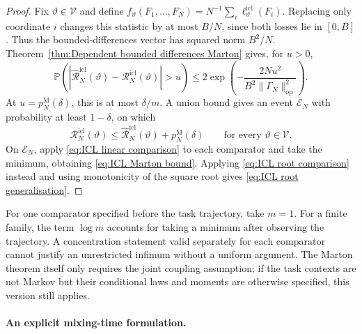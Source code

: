 \begin{proof}
Fix \(\vartheta\in\mathcal V\) and define \(f_\vartheta(F_1,\ldots,F_N)=N^{-1}\sum_i\ell_\vartheta^{\mathrm{icl}}(F_i)\). Replacing only coordinate \(i\) changes this statistic by at most \(B/N\), since both losses lie in \([0,B]\). Thus the bounded-differences vector has squared norm \(B^2/N\). Theorem~\ref{thm:Dependent bounded differences Marton} gives, for \(u>0\),
\[
\mathbb P\left(
\left|\widehat{\mathcal R}_N^{\mathrm{icl}}(\vartheta)
-\mathcal R_N^{\mathrm{icl}}(\vartheta)\right|>u\right)
\leqslant2\exp\left(-\frac{2Nu^2}{B^2\|\Gamma_N\|_{\mathrm{op}}^2}\right).
\]
At \(u=p_N^{\mathrm M}(\delta)\), this is at most \(\delta/m\). A union bound gives an event \(\mathcal E_N\) with probability at least \(1-\delta\), on which
\begin{equation}
\label{eq:ICL simultaneous comparator event}
\mathcal R_N^{\mathrm{icl}}(\vartheta)
\leqslant\widehat{\mathcal R}_N^{\mathrm{icl}}(\vartheta)+p_N^{\mathrm M}(\delta)
\qquad\text{for every }\vartheta\in\mathcal V.
\end{equation}
On \(\mathcal E_N\), apply \eqref{eq:ICL linear comparison} to each comparator and take the minimum, obtaining \eqref{eq:ICL Marton bound}. Applying \eqref{eq:ICL root comparison} instead and using monotonicity of the square root gives \eqref{eq:ICL root generalisation}.
\end{proof}

For one comparator specified before the task trajectory, take \(m=1\). For a finite family, the term \(\log m\) accounts for taking a minimum after observing the trajectory. A concentration statement valid separately for each comparator cannot justify an unrestricted infimum without a uniform argument. The Marton theorem itself only requires the joint coupling assumption; if the task contexts are not Markov but their conditional laws and moments are otherwise specified, this version still applies.

\paragraph{An explicit mixing-time formulation.}

